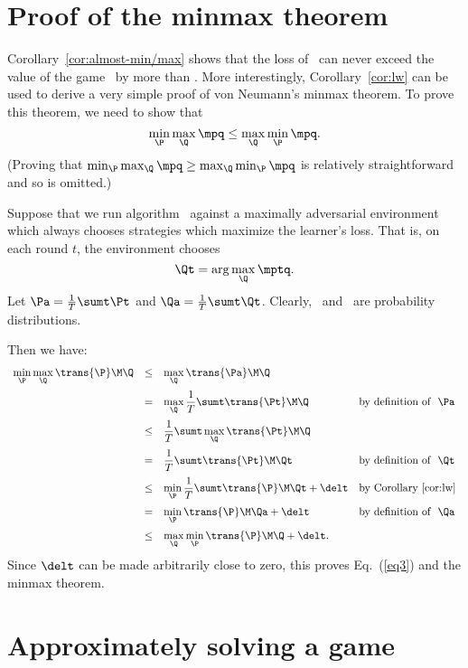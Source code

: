 \section{Proof of the minmax theorem} \label{sec:minmax-proof}

Corollary~\ref{cor:almost-min/max} shows that the loss of \lwalg\ can never
exceed the value of the game \M\ by more than \delt.
More interestingly, Corollary~\ref{cor:lw} can be used to derive a
very simple proof of von Neumann's minmax theorem.
To prove this theorem, we need to show that
{\em
\begin{equation} \label{eq3}
   \minp \maxq \mpq \leq \maxq \minp \mpq.
\end{equation}
}%
(Proving that {\em $\minp \maxq \mpq \geq \maxq \minp \mpq$} is relatively
straightforward and so is omitted.)

Suppose that we run algorithm \lwalg\ against a maximally adversarial
environment which always chooses strategies which maximize the
learner's loss.
That is, on each round $t$, the environment chooses
{\em
\begin{equation} \label{eq4}
   \Qt = \arg \maxq \mptq.
\end{equation}
}%
Let $\Pa = \frac{1}{T} \sumt \Pt$ and
$\Qa = \frac{1}{T} \sumt \Qt$.
Clearly, \Pa\ and \Qa\ are probability distributions.

Then we have:
{\em
\[
\begin{array}{rcll}
{\displaystyle{\minp \maxq \trans{\P}\M\Q}} 
 &\leq&
\displaystyle{\maxq \trans{\Pa}\M\Q} &\nextline
  &=&
\displaystyle{\maxq \frac{1}{T} \sumt \trans{\Pt}\M\Q}
                       &\mbox{\rm by definition of~~\Pa}\nextline
  &\leq&
\displaystyle{\frac{1}{T} \sumt \maxq \trans{\Pt}\M\Q} &\nextline
  &=&
\displaystyle{\frac{1}{T} \sumt \trans{\Pt}\M\Qt}
                       &\mbox{\rm by definition of~~\Qt}\nextline
  &\leq&
\displaystyle{\minp \frac{1}{T} \sumt \trans{\P}\M\Qt + \delt}
                       &\mbox{\rm by Corollary~\ref{cor:lw}}\nextline
  &=&
\displaystyle{\minp \trans{\P}\M\Qa + \delt}
                       &\mbox{\rm by definition of~~\Qa}\nextline
  &\leq&
\displaystyle{\maxq \minp \trans{\P}\M\Q + \delt.} &
\end{array}
\]
}%
Since $\delt$ can be made arbitrarily close to zero, this proves
Eq.~(\ref{eq3}) and the minmax theorem.

\section{Approximately solving a game} \label{sec:minmax-solve}


